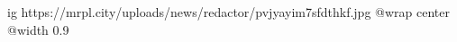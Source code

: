  
 
 
 
 

\ifcmt
  ig https://mrpl.city/uploads/news/redactor/pvjyayim7sfdthkf.jpg
  @wrap center
  @width 0.9
\fi

